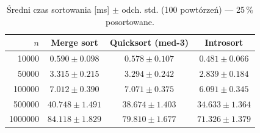 \begin{table}[H]
\centering
\caption{Średni czas sortowania [ms] $\pm$ odch. std. (100 powtórzeń) — 25\,\% posortowane.}
\label{tab:summary_sorted_25}
\begin{tabular}{rccc}
\toprule
$n$ & Merge sort & Quicksort (med-3) & Introsort \\
\midrule
\num{10000} & $0.590 \pm 0.098$ & $0.578 \pm 0.107$ & $0.481 \pm 0.066$ \\
\num{50000} & $3.315 \pm 0.215$ & $3.294 \pm 0.242$ & $2.839 \pm 0.184$ \\
\num{100000} & $7.012 \pm 0.390$ & $7.071 \pm 0.375$ & $6.091 \pm 0.345$ \\
\num{500000} & $40.748 \pm 1.491$ & $38.674 \pm 1.403$ & $34.633 \pm 1.364$ \\
\num{1000000} & $84.118 \pm 1.829$ & $79.810 \pm 1.677$ & $71.326 \pm 1.379$ \\
\bottomrule
\end{tabular}
\end{table}
